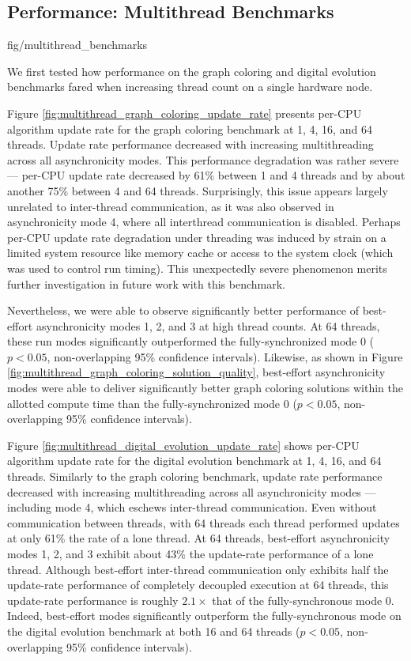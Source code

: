 \subsection{Performance: Multithread Benchmarks}
\label{sec:multithread-benchmarks}

{fig/multithread_benchmarks}

We first tested how performance on the graph coloring and digital evolution benchmarks fared when increasing thread count on a single hardware node.

Figure \ref{fig:multithread_graph_coloring_update_rate} presents per-CPU algorithm update rate for the graph coloring benchmark at 1, 4, 16, and 64 threads.
Update rate performance decreased with increasing multithreading across all asynchronicity modes.
This performance degradation was rather severe --- per-CPU update rate decreased by 61\% between 1 and 4 threads and by about another 75\% between 4 and 64 threads.
Surprisingly, this issue appears largely unrelated to inter-thread communication, as it was also observed in asynchronicity mode 4, where all interthread communication is disabled.
Perhaps per-CPU update rate degradation under threading was induced by strain on a limited system resource like memory cache or access to the system clock (which was used to control run timing).
This unexpectedly severe phenomenon merits further investigation in future work with this benchmark.

Nevertheless, we were able to observe significantly better performance of best-effort asynchronicity modes 1, 2, and 3 at high thread counts.
At 64 threads, these run modes significantly outperformed the fully-synchronized mode 0 ($p < 0.05$, non-overlapping 95\% confidence intervals).
Likewise, as shown in Figure \ref{fig:multithread_graph_coloring_solution_quality}, best-effort asynchronicity modes were able to deliver significantly better graph coloring solutions within the allotted compute time than the fully-synchronized mode 0 ($p < 0.05$, non-overlapping 95\% confidence intervals).

Figure \ref{fig:multithread_digital_evolution_update_rate} shows per-CPU algorithm update rate for the digital evolution benchmark at 1, 4, 16, and 64 threads.
Similarly to the graph coloring benchmark, update rate performance decreased with increasing multithreading across all asynchronicity modes --- including mode 4, which eschews inter-thread communication.
Even without communication between threads, with 64 threads each thread performed updates at only 61\% the rate of a lone thread.
At 64 threads, best-effort asynchronicity modes 1, 2, and 3 exhibit about 43\% the update-rate performance of a lone thread.
Although best-effort inter-thread communication only exhibits half the update-rate performance of completely decoupled execution at 64 threads, this update-rate performance is roughly $2.1\times$ that of the fully-synchronous mode 0.
Indeed, best-effort modes significantly outperform the fully-synchronous mode on the digital evolution benchmark at both 16 and 64 threads ($p < 0.05$, non-overlapping 95\% confidence intervals).

